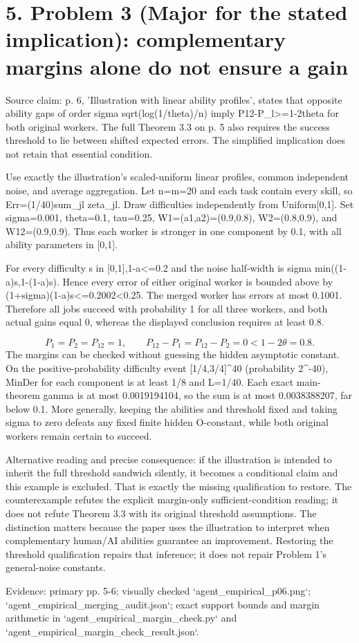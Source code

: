 \documentclass[10pt]{article}
\begin{document}
\section*{5. Problem 3 (Major for the stated implication): complementary margins alone do not ensure a gain}
Source claim: p. 6, ’Illustration with linear ability profiles’, states that opposite ability gaps of order sigma sqrt(log(1/theta)/n) imply P12-P\_l>=1-2theta for both original workers. The full Theorem 3.3 on p. 5 also requires the success threshold to lie between shifted expected errors. The simplified implication does not retain that essential condition.\par
Use exactly the illustration’s scaled-uniform linear profiles, common independent noise, and average aggregation. Let n=m=20 and each task contain every skill, so Err=(1/40)sum\_jl zeta\_jl. Draw difficulties independently from Uniform[0,1]. Set sigma=0.001, theta=0.1, tau=0.25, W1=(a1,a2)=(0.9,0.8), W2=(0.8,0.9), and W12=(0.9,0.9). Thus each worker is stronger in one component by 0.1, with all ability parameters in [0,1].\par
For every difficulty s in [0,1],1-a<=0.2 and the noise half-width is sigma min((1-a)s,1-(1-a)s). Hence every error of either original worker is bounded above by (1+sigma)(1-a)s<=0.2002<0.25. The merged worker has errors at most 0.1001. Therefore all jobs succeed with probability 1 for all three workers, and both actual gains equal 0, whereas the displayed conclusion requires at least 0.8.\par
\[P_1=P_2=P_{12}=1,\qquad P_{12}-P_1=P_{12}-P_2=0<1-2\theta=0.8.\] The margins can be checked without guessing the hidden asymptotic constant. On the positive-probability difficulty event [1/4,3/4]\textasciicircum{}40 (probability 2\textasciicircum{}-40), MinDer for each component is at least 1/8 and L=1/40. Each exact main-theorem gamma is at most 0.0019194104, so the sum is at most 0.0038388207, far below 0.1. More generally, keeping the abilities and threshold fixed and taking sigma to zero defeats any fixed finite hidden O-constant, while both original workers remain certain to succeed.\par
Alternative reading and precise consequence: if the illustration is intended to inherit the full threshold sandwich silently, it becomes a conditional claim and this example is excluded. That is exactly the missing qualification to restore. The counterexample refutes the explicit margin-only sufficient-condition reading; it does not refute Theorem 3.3 with its original threshold assumptions. The distinction matters because the paper uses the illustration to interpret when complementary human/AI abilities guarantee an improvement. Restoring the threshold qualification repairs that inference; it does not repair Problem 1’s general-noise constants.\par
Evidence: primary pp. 5-6; visually checked `agent\_empirical\_p06.png`; `agent\_empirical\_merging\_audit.json`; exact support bounds and margin arithmetic in `agent\_empirical\_margin\_check.py` and `agent\_empirical\_margin\_check\_result.json`.\par
\end{document}
